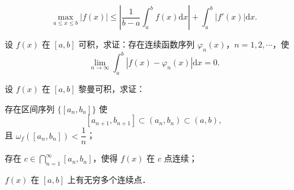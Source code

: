 \begin{xiti}
\[\max_{a \leqslant x \leqslant b} \left| f(x) \right| \leqslant \left| \frac{1}{b - a} \int_{a}^{b} f(x) \mathrm{d}x \right| + \int_{a}^{b} \left| f'(x) \right| \mathrm{d}x.
\]
\item 设 $f(x)$ 在 $[a, b]$ 可积，求证：存在连续函数序列 $\varphi_n(x)$，$n = 1, 2, \cdots$，使
\[
\lim_{n \to \infty} \int_{a}^{b} \left| f(x) - \varphi_n(x) \right| \mathrm{d}x = 0.
\]
\item 设 $f(x)$ 在 $[a, b]$ 黎曼可积，求证：
\begin{ziti}
\item 存在区间序列 $\{[a_n, b_n]\}$ 使
\[
\left[ a_{n+1}, b_{n+1} \right] \subset \left( a_n, b_n \right) \subset (a, b),
\]
且 $\omega_f \left( [a_n, b_n] \right) < \dfrac{1}{n}$；
\item 存在 $c \in \bigcap\limits_{n=1}^{\infty} \left[ a_n, b_n \right]$，使得 $f(x)$ 在 $c$ 点连续；
\item $f(x)$ 在 $[a, b]$ 上有无穷多个连续点．
\end{ziti}
\end{xiti}
